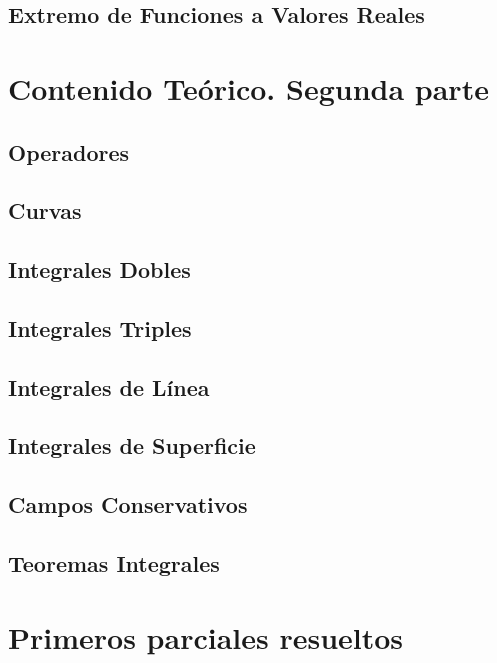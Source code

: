 \documentclass[10pt, a4paper]{report}
\begin{document}
        \section{Extremo de Funciones a Valores Reales} 
            

    \chapter{Contenido Teórico. Segunda parte}
        \section{Operadores}
            
        \section{Curvas}
            
        \section{Integrales Dobles} 
            
        \section{Integrales Triples}
            
        \section{Integrales de L\'inea}
            
        \section{Integrales de Superficie}
        \section{Campos Conservativos}
            
        \section{Teoremas Integrales}
            

    \chapter{Primeros parciales resueltos}
\end{document}

